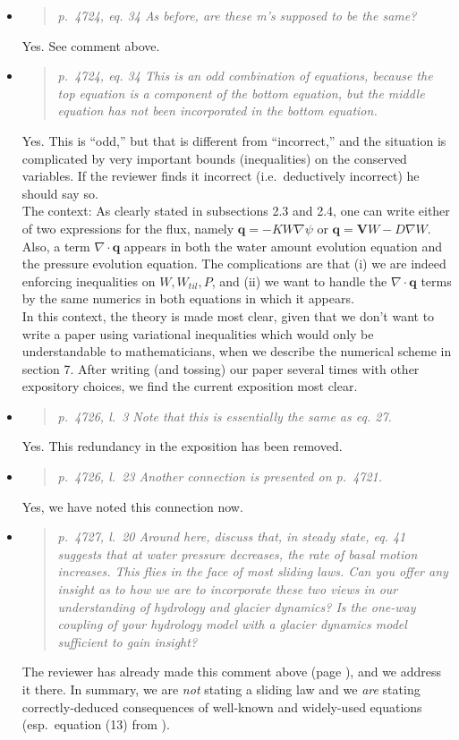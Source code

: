 \documentclass[11pt,reqno]{amsart}
\newcommand{\grad}{\nabla}
\newcommand{\reply}[2]{
\medskip\medskip
\item  \begin{quote}
\emph{#1}
\end{quote}

\medskip
\noindent #2}
\begin{document}
\begin{itemize}
\reply{p.~4724, eq. 34 As before, are these m's supposed to be the same?}
{Yes.  See comment above.}

\reply{p.~4724, eq. 34 This is an odd combination of equations, because the top equation is a component of the bottom equation, but the middle equation has not been incorporated in the bottom equation.}
{Yes.  This is ``odd,'' but that is different from ``incorrect,'' and the situation is complicated by very important bounds (inequalities) on the conserved variables.  If the reviewer finds it incorrect (i.e.~deductively incorrect) he should say so.\\
\indent The context: As clearly stated in subsections 2.3 and 2.4, one can write either of two expressions for the flux, namely $\mathbf{q} = -K W \grad \psi$ or $\mathbf{q} = \mathbf{V} W - D \grad W$.  Also, a term $\nabla\cdot\mathbf{q}$ appears in both the water amount evolution equation and the pressure evolution equation.  The complications are that (i) we are indeed enforcing inequalities on $W,W_{til},P$, and (ii) we want to handle the $\nabla\cdot\mathbf{q}$ terms by the same numerics in both equations in which it appears.\\
\indent  In this context, the theory is made most clear, given that we don't want to write a paper using variational inequalities which would only be understandable to mathematicians, when we describe the numerical scheme in section 7.  After writing (and tossing) our paper several times with other expository choices, we find the current exposition most clear.}

\reply{p.~4726, l.~3 Note that this is essentially the same as eq. 27.}
{Yes.  This redundancy in the exposition has been removed.}

\reply{p.~4726, l.~23 Another connection is presented on p.~4721.}
{Yes, we have noted this connection now.}

\reply{p.~4727, l.~20 Around here, discuss that, in steady state, eq. 41 suggests that at water pressure decreases, the rate of basal motion increases. This flies in the face of most sliding laws. Can you offer any insight as to how we are to incorporate these two views in our understanding of hydrology and glacier dynamics?  Is the one-way coupling of your hydrology model with a glacier dynamics model sufficient to gain insight?}
{The reviewer has already made this comment above (page \pageref{inversepage}), and we address it there.  In summary, we are \emph{not} stating a sliding law and we \emph{are} stating correctly-deduced consequences of well-known and widely-used equations (esp.~equation (13) from \cite{Hewitt2011}).}


\end{itemize}
\end{document}
